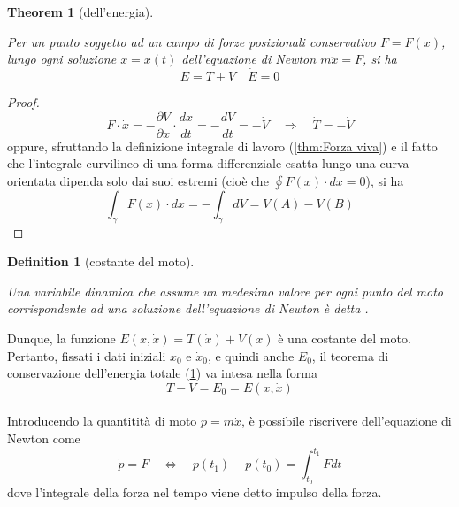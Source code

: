 \documentclass{article}
\newtheorem{theorem}{Theorem}[section]
\newtheorem{definition}{Definition}[section]
\begin{document}
            \begin{theorem}[dell'energia]
                \label{thm:Conservazione dell'energia}

                Per un punto soggetto ad un campo di forze posizionali conservativo $F = F(x)$, lungo ogni soluzione $x = x(t)$ dell'equazione di Newton $m \ddot{x} = F$, 
                si ha \[ E = T + V \quad \dot{E} = 0 \]
                
            \end{theorem}
            \begin{proof}

                \[ F \cdot \dot{x} = - \frac{\partial V}{\partial x} \cdot \frac{dx}{dt} = - \frac{dV}{dt} = - \dot{V} \quad \Longrightarrow \quad \dot{T} = -\dot{V} \]
                oppure, sfruttando la definizione integrale di lavoro (\ref{thm:Forza viva}) e il fatto che l'integrale curvilineo di una forma differenziale esatta
                lungo una curva orientata dipenda solo dai suoi estremi (cioè che $\oint F(x) \cdot dx = 0$), si ha
                \[ \int_{\gamma}F(x) \cdot dx = - \int_{\gamma} dV = V(A) - V(B) \]

            \end{proof}
            
            \begin{definition}[costante del moto]
                \label{def:costante del moto}

                Una variabile dinamica che assume un medesimo valore per ogni punto del moto corrispondente ad una soluzione dell'equazione di Newton è detta .
            
            \end{definition}
            Dunque, la funzione $E(x, \dot{x}) = T(\dot{x}) + V(x)$ è una costante del moto. Pertanto, fissati i dati iniziali $x_0$ e $\dot{x}_0$, e quindi anche $E_0$,
            il teorema di conservazione dell'energia totale (\ref{thm:Conservazione dell'energia}) va intesa nella forma \[ T - V = E_0 = E(x, \dot{x})\] \\
            Introducendo la quantitità di moto $p = m \dot{x}$, è possibile riscrivere dell'equazione di Newton come \[ \dot{p} = F \quad \Longleftrightarrow \quad p(t_1) - p(t_0) = \int_{t_0}^{t_1} F dt \] 
            dove l'integrale della forza nel tempo viene detto impulso della forza. \\
\end{document}
